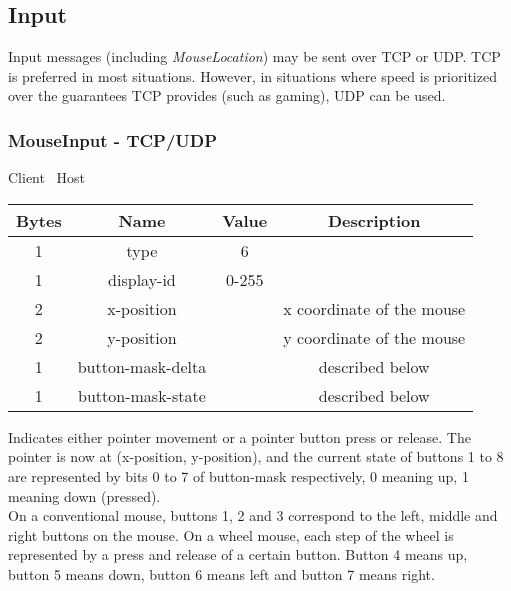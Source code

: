\subsection{Input}

Input messages (including \emph{MouseLocation}) may be sent over TCP or UDP. TCP is preferred in most situations.
However, in situations where speed is prioritized over the guarantees TCP provides (such as gaming), UDP can be
used.

\subsubsection{MouseInput - TCP/UDP}

\begin{center}
    Client \textrightarrow\ Host\\
    \begin{tabular}{|c|c|c|c|}
        \hline
        \textbf{Bytes} & \textbf{Name}     & \textbf{Value} & \textbf{Description}      \\
        \hline
        1              & type              & 6              &                           \\
        \hline
        1              & display-id        & 0-255          &                           \\
        \hline
        2              & x-position        &                & x coordinate of the mouse \\
        \hline
        2              & y-position        &                & y coordinate of the mouse \\
        \hline
        1              & button-mask-delta &                & described below           \\
        \hline
        1              & button-mask-state &                & described below           \\
        \hline
    \end{tabular}
\end{center}

Indicates either pointer movement or a pointer button press or release. The pointer is now at (x-position,
y-position), and the current state of buttons 1 to 8 are represented by bits 0 to 7 of button-mask respectively,
0 meaning up, 1 meaning down (pressed).\\

On a conventional mouse, buttons 1, 2 and 3 correspond to the left, middle and right buttons on the mouse. On a
wheel mouse, each step of the wheel is represented by a press and release of a certain button. Button 4 means up,
button 5 means down, button 6 means left and button 7 means right.\\

